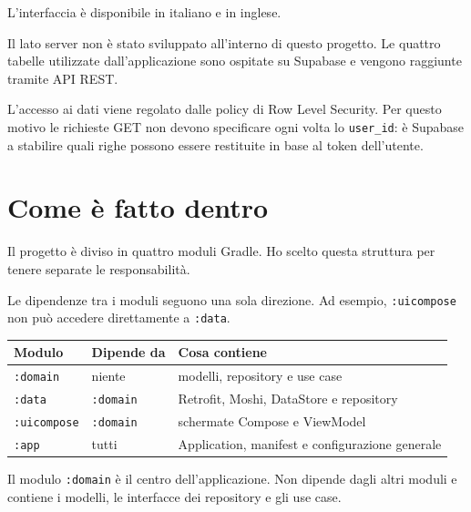 \documentclass[11pt,a4paper]{article}
\begin{document}
L'interfaccia è disponibile in italiano e in inglese.

Il lato server non è stato sviluppato all'interno di questo progetto. Le quattro
tabelle utilizzate dall'applicazione sono ospitate su Supabase e vengono
raggiunte tramite API REST.

L'accesso ai dati viene regolato dalle policy di Row Level Security. Per questo
motivo le richieste GET non devono specificare ogni volta lo
\texttt{user\_id}: è Supabase a stabilire quali righe possono essere restituite
in base al token dell'utente.


\section{Come è fatto dentro}

Il progetto è diviso in quattro moduli Gradle. Ho scelto questa struttura per
tenere separate le responsabilità.

Le dipendenze tra i moduli seguono una sola direzione. Ad esempio,
\texttt{:uicompose} non può accedere direttamente a \texttt{:data}.

\begin{table}[h]
\centering
\begin{tabular}{@{}lll@{}}
\toprule
Modulo & Dipende da & Cosa contiene \\
\midrule

\texttt{:domain} & niente &
modelli, repository e use case \\

\addlinespace[0.3em]

\texttt{:data} & \texttt{:domain} &
Retrofit, Moshi, DataStore e repository \\

\addlinespace[0.3em]

\texttt{:uicompose} & \texttt{:domain} &
schermate Compose e ViewModel \\

\addlinespace[0.3em]

\texttt{:app} & tutti &
Application, manifest e configurazione generale \\

\bottomrule
\end{tabular}
\end{table}

Il modulo \texttt{:domain} è il centro dell'applicazione. Non dipende dagli
altri moduli e contiene i modelli, le interfacce dei repository e gli use case.
\end{document}
